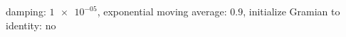 damping: $\num[scientific-notation=true]{1e-05}$, exponential moving average: $\num[scientific-notation=true]{0.9}$, initialize Gramian to identity: $\text{no}$
